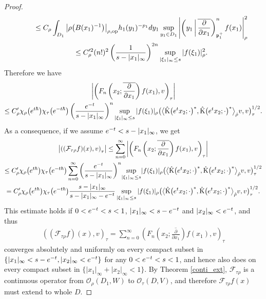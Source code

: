 \documentclass[11pt]{article}
\numberwithin{equation}{section}
\newcommand{\fp}{\mathfrak{p}}
\newcommand{\cF}{\mathcal{F}}
\newcommand{\cO}{\mathcal{O}}
\newcommand{\rK}{\mathrm{K}}
\begin{document}
\begin{proof}
\begin{gather}
\qquad{} \le C_\rho\int_{D_1} \big|\rho\big(B(x_1)^{-1}\big)\big|_{\rho,\mathrm{op}}h_1(y_1)^{-p_1}{\rm d}y_1
\sup_{y_1\in D_1}\left|\left(y_1\,\middle|\,\overline{\frac{\partial}{\partial x_1}}\right)_{\fp^+_1}^nf(x_1)\right|_\rho^2 \notag \\
\qquad{} \le C_\rho^{\prime 2}(n!)^2\left(\frac{1}{s-|x_1|_\infty}\right)^{2n}\sup_{|\xi_1|_\infty\le s}|f(\xi_1)|_\rho^2. \label{higherdiff}
\end{gather}
Therefore we have
\begin{gather*}
 \left|\left(F_n\left(x_2;\overline{\frac{\partial}{\partial x_1}}\right)f(x_1),v\right)_\tau\right| \\
 \le C_\rho'\chi_\rho\big({\rm e}^{t\hbar}\big)\chi_\tau\big({\rm e}^{-t\hbar}\big)
\left(\frac{{\rm e}^{-t}}{s-|x_1|_\infty}\right)^n\sup_{|\xi_1|_\infty\le s}|f(\xi_1)|_\rho
\big(\big\langle\hat{\rK}\big({\rm e}^tx_2;\cdot\big)^*,
\hat{\rK}\big({\rm e}^tx_2;\cdot\big)^*\big\rangle_{\hat{\rho}}v,v\big)_\tau^{1/2}.
\end{gather*}
As a consequence, if we assume ${\rm e}^{-t}<s-|x_1|_\infty$, we get
\begin{gather*}
 \left|\left((\cF_{\tau\rho}f)(x),v\right)_\tau\right|\le\sum_{n=0}^\infty
\left|\left(F_n\left(x_2;\overline{\frac{\partial}{\partial x_1}}\right)f(x_1),v\right)_\tau\right| \\
 \le C_\rho'\chi_\rho\big({\rm e}^{t\hbar}\big)\chi_\tau\big({\rm e}^{-t\hbar}\big)
\sum_{n=0}^\infty \left(\frac{{\rm e}^{-t}}{s-|x_1|_\infty}\right)^n\!\sup_{|\xi_1|_\infty\le s}\!|f(\xi_1)|_\rho
\big(\big\langle\hat{\rK}\big({\rm e}^tx_2;\cdot\big)^* ,
\hat{\rK}\big({\rm e}^tx_2;\cdot\big)^*\big\rangle_{\hat{\rho}}v,v\big)_\tau^{1/2} \\
 =C_\rho'\chi_\rho\big({\rm e}^{t\hbar}\big)\chi_\tau\big({\rm e}^{-t\hbar}\big)\frac{s-|x_1|_\infty}{s-|x_1|_\infty-{\rm e}^{-t}}\sup_{|\xi_1|_\infty\le s}|f(\xi_1)|_\rho
\big(\big\langle\hat{\rK}\big({\rm e}^tx_2;\cdot\big)^*,
\hat{\rK}\big({\rm e}^tx_2;\cdot\big)^*\big\rangle_{\hat{\rho}}v,v\big)_\tau^{1/2}.
\end{gather*}
This estimate holds if $0<{\rm e}^{-t}<s<1$, $|x_1|_\infty<s-{\rm e}^{-t}$ and $|x_2|_\infty<{\rm e}^{-t}$, and thus
\begin{gather*}
 ((\cF_{\tau\rho}f)(x),v )_\tau=\sum_{n=0}^\infty\left(F_n\left(x_2;\overline{\frac{\partial}{\partial x_1}}\right)f(x_1),v\right)_\tau
\end{gather*}
converges absolutely and uniformly on every compact subset in $\{|x_1|_\infty<s-{\rm e}^{-t},|x_2|_\infty<{\rm e}^{-t}\}$ for any $0<{\rm e}^{-t}<s<1$,
and hence also does on every compact subset in $\{|x_1|_\infty+|x_2|_\infty<1\}$.
By Theorem \ref{conti_ext}, $\cF_{\tau\rho}$ is a continuous operator from $\cO_\rho(D_1,W)$ to $\cO_\tau(D,V)$,
and therefore $\cF_{\tau\rho} f(x)$ must extend to whole $D$.
\end{proof}
\end{document}
